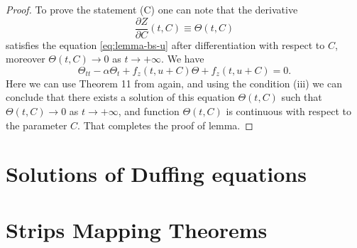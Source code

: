 \begin{proof}
	To prove the statement (C) one can note that the derivative
	\begin{equation}
		\dfrac{\partial Z}{\partial C}(t, C) \equiv \Theta(t, C)
	\end{equation}
	satisfies the equation \eqref{eq:lemma-bs-u} after differentiation with respect to $C$, moreover $\Theta(t, C) \to 0$ as $t \to +\infty$.
	We have
	\begin{equation}
		\Theta_{tt} - \alpha \Theta_t + f_z(t, u + C) \Theta + f_z(t, u + C) = 0.
	\end{equation}
	Here we can use Theorem 11 from \cite[Chapter 3]{Coppel} again, and using the condition (iii) we can conclude that there exists a solution of this equation $\Theta(t, C)$ such that $\Theta(t, C) \to 0$ as $t \to +\infty$, and function $\Theta(t, C)$ is continuous with respect to the parameter $C$.
	That completes the proof of lemma.
\end{proof}

\chapter{Solutions of Duffing equations}
\label{appendix:solutions-of-duffing-equations}

\chapter{Strips Mapping Theorems}
\label{appendix:strips-mapping-theorems}

